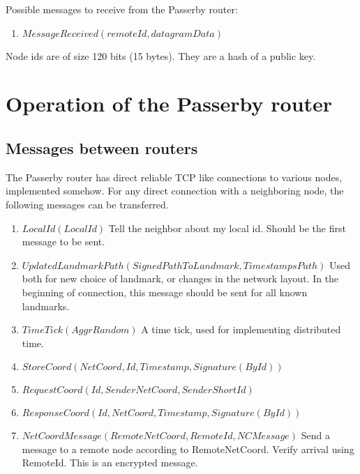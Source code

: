 \documentclass{amsart}
\theoremstyle{definition}
\theoremstyle{remark}
\numberwithin{equation}{section}
\begin{document}
Possible messages to receive from the Passerby router:
\begin{enumerate}
  \item $MessageReceived (remoteId, datagramData)$
\end{enumerate}

Node ids are of size 120 bits (15 bytes). They are a hash of a public key.

\section{Operation of the Passerby router}

\subsection{Messages between routers}

The Passerby router has direct reliable TCP like connections to various nodes,
implemented somehow. For any direct connection with a neighboring node, the
following messages can be transferred.



\begin{enumerate}
  \item $LocalId(LocalId)$
      Tell the neighbor about my local id. Should be the first message to be
      sent.
  \item $UpdatedLandmarkPath(SignedPathToLandmark, TimestampsPath)$
      Used both for new choice of landmark, or changes in the network layout.
      In the beginning of connection, this message should be sent for all known
      landmarks. 
  \item $TimeTick(AggrRandom)$
      A time tick, used for implementing distributed time.

  \item $StoreCoord(NetCoord, Id, Timestamp, Signature(By Id))$
  \item $RequestCoord(Id, SenderNetCoord, SenderShortId)$
  \item $ResponseCoord(Id, NetCoord, Timestamp, Signature(By Id))$ 

  \item $NetCoordMessage(RemoteNetCoord, RemoteId, NCMessage)$
    Send a message to a remote node according to RemoteNetCoord. Verify arrival
    using RemoteId. This is an encrypted message.
\end{enumerate}
\end{document}
